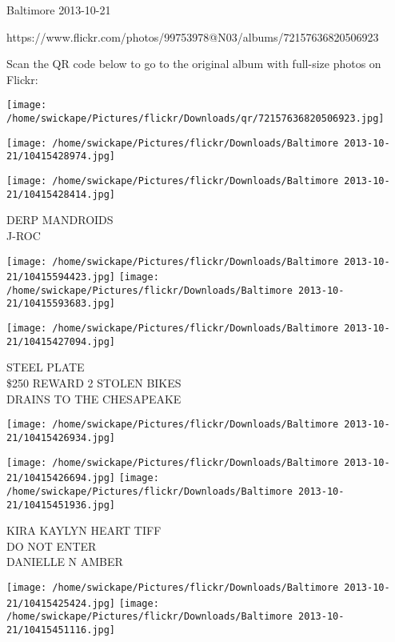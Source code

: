 \documentclass[10pt,letterpaper]{article}
\begin{document}
Baltimore 2013-10-21

https://www.flickr.com/photos/99753978@N03/albums/72157636820506923

Scan the QR code below to go to the original album with full-size photos on Flickr:

\texttt{[image: /home/swickape/Pictures/flickr/Downloads/qr/72157636820506923.jpg]}
\pagebreak

\texttt{[image: /home/swickape/Pictures/flickr/Downloads/Baltimore 2013-10-21/10415428974.jpg]}

\vspace{0.25in}
\texttt{[image: /home/swickape/Pictures/flickr/Downloads/Baltimore 2013-10-21/10415428414.jpg]}

DERP MANDROIDS\\
J{-}ROC\\
\pagebreak

\texttt{[image: /home/swickape/Pictures/flickr/Downloads/Baltimore 2013-10-21/10415594423.jpg]}
\texttt{[image: /home/swickape/Pictures/flickr/Downloads/Baltimore 2013-10-21/10415593683.jpg]}

\vspace{0.25in}
\texttt{[image: /home/swickape/Pictures/flickr/Downloads/Baltimore 2013-10-21/10415427094.jpg]}

STEEL PLATE\\
\$250 REWARD 2 STOLEN BIKES\\
DRAINS TO THE CHESAPEAKE\\
\pagebreak

\texttt{[image: /home/swickape/Pictures/flickr/Downloads/Baltimore 2013-10-21/10415426934.jpg]}

\vspace{0.25in}
\texttt{[image: /home/swickape/Pictures/flickr/Downloads/Baltimore 2013-10-21/10415426694.jpg]}
\texttt{[image: /home/swickape/Pictures/flickr/Downloads/Baltimore 2013-10-21/10415451936.jpg]}

KIRA KAYLYN HEART TIFF\\
DO NOT ENTER\\
DANIELLE N AMBER\\
\pagebreak

\texttt{[image: /home/swickape/Pictures/flickr/Downloads/Baltimore 2013-10-21/10415425424.jpg]}
\texttt{[image: /home/swickape/Pictures/flickr/Downloads/Baltimore 2013-10-21/10415451116.jpg]}
\end{document}
